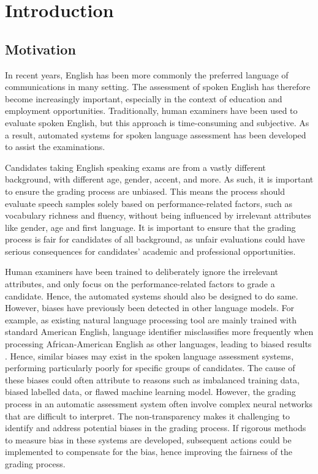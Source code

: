 \chapter{Introduction}

\section{Motivation}
In recent years, English has been more commonly the preferred language of communications in many setting. The assessment of spoken English has therefore become increasingly important, especially in the context of education and employment opportunities. Traditionally, human examiners have been used to evaluate spoken English, but this approach is time-consuming and subjective. As a result, automated systems for spoken language assessment has been developed to assist the examinations.

Candidates taking English speaking exams are from a vastly different background, with different age, gender, accent, and more. As such, it is important to ensure the grading process are unbiased. This means the process should evaluate speech samples solely based on performance-related factors, such as vocabulary richness and fluency, without being influenced by irrelevant attributes like gender, age and first language. It is important to ensure that the grading process is fair for candidates of all background, as unfair evaluations could have serious consequences for candidates' academic and professional opportunities.

Human examiners have been trained to deliberately ignore the irrelevant attributes, and only focus on the performance-related factors to grade a candidate. Hence, the automated systems should also be designed to do same. However, biases have previously been detected in other language models. For example, as existing natural language processing tool are mainly trained with standard American English, language identifier misclassifies more frequently when processing African-American English as other languages, leading to biased results \cite{bias}. Hence, similar biases may exist in the spoken language assessment systems, performing particularly poorly for specific groups of candidates. The cause of these biases could often attribute to reasons such as imbalanced training data, biased labelled data, or flawed machine learning model. However, the grading process in an automatic assessment system often involve complex neural networks that are difficult to interpret. The non-transparency makes it challenging to identify and address potential biases in the grading process. If rigorous methods to measure bias in these systems are developed, subsequent actions could be implemented to compensate for the bias, hence improving the fairness of the grading process.

